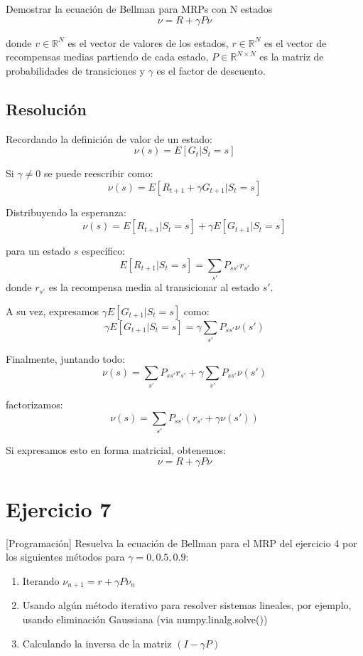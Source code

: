 \documentclass[12pt,a4paper]{article}
\begin{document}
Demostrar la ecuación de Bellman para MRPs con N estados
$$ \nu = R + \gamma P \nu $$

donde $v \in \mathbb{R}^N$ es el vector de valores de los estados, $r \in \mathbb{R}^N$ es el vector de recompensas medias 
partiendo de cada estado, $P \in \mathbb{R}^{N \times N}$ es la matriz de probabilidades de transiciones y 
$\gamma$ es el factor de descuento.

\subsection{Resolución}

Recordando la definición de valor de un estado:
$$ \nu(s) = E[G_t | S_t = s] $$

Si $\gamma \neq 0$ se puede reescribir como:
$$ \nu(s) = E[R_{t+1} + \gamma G_{t+1} | S_t = s] $$

Distribuyendo la esperanza:
$$ \nu(s) = E[R_{t+1} | S_t = s] + \gamma E[G_{t+1} | S_t = s] $$

para un estado $s$ específico:
$$ E[R_{t+1} | S_t = s] = \sum_{s'} P_{ss'} r_{s'} $$
donde $r_{s'}$ es la recompensa media al transicionar al estado $s'$.

A su vez, expresamos $\gamma E[G_{t+1} | S_t = s]$ como:
$$ \gamma E[G_{t+1} | S_t = s] = \gamma \sum_{s'} P_{ss'} \nu(s') $$

Finalmente, juntando todo:
$$ \nu(s) = \sum_{s'} P_{ss'} r_{s'} + \gamma \sum_{s'} P_{ss'} \nu(s') $$

factorizamos:
$$ \nu(s) = \sum_{s'} P_{ss'} (r_{s'} + \gamma \nu(s')) $$

Si expresamos esto en forma matricial, obtenemos:
$$ \nu = R + \gamma P \nu $$

\section{Ejercicio 7} %

[Programación] Resuelva la ecuación de Bellman para el MRP del ejercicio 4 por los siguientes métodos
para $\gamma = 0,0.5,0.9$:

\begin{enumerate}
    \item Iterando $\nu_{n+1} = r + \gamma P \nu_n$
    \item Usando algún método iterativo para resolver sistemas lineales, por ejemplo, usando eliminación Gaussiana (via numpy.linalg.solve())
    \item Calculando la inversa de la matriz $ (I - \gamma P)$
\end{enumerate}
\end{document}
